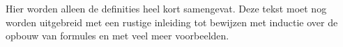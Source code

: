 \documentclass[../../../include/open-logic-chapter]{subfiles}
\begin{document}

\begin{editorial}
  Hier worden alleen de definities heel kort samengevat. Deze tekst moet
  nog worden uitgebreid met een rustige inleiding tot bewijzen met
  inductie over de opbouw van formules en met veel meer voorbeelden.
\end{editorial}







\OLEndChapterHook
\end{document}
